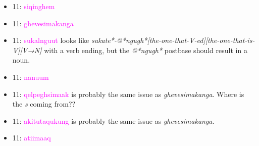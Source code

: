 \documentclass{article}
\begin{document}
\begin{itemize}
\item 11: \textcolor{magenta}{siqinghem}

\item 11: \textcolor{magenta}{ghevesimakanga}

\item 11: \textcolor{magenta}{sukalnguut} looks like \textit{sukate*-@*ngugh*[the-one-that-V-ed][the-one-that-is-V][V→N]} with a verb ending, but the \textit{@*ngugh*} postbase should result in a noun.

\item 11: \textcolor{magenta}{nanuum}

\item 11: \textcolor{magenta}{qelpeghsimaak} is probably the same issue as \textit{ghevesimakanga}.
%
Where is the \textit{s} coming from??

\item 11: \textcolor{magenta}{akitutaqukung} is probably the same issue as \textit{ghevesimakanga}.

\item 11: \textcolor{magenta}{atiimaaq}


\end{itemize}
\end{document}
